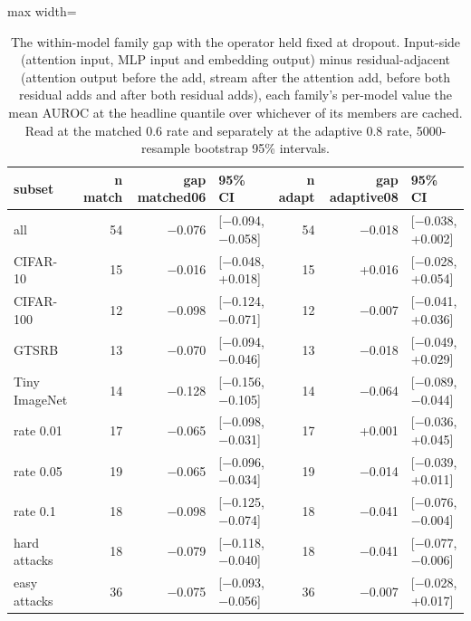 \begin{table}[htbp]
\centering
\small
\caption{The within-model family gap with the operator held fixed at dropout. Input-side (attention input, MLP input and embedding output) minus residual-adjacent (attention output before the add, stream after the attention add, before both residual adds and after both residual adds), each family's per-model value the mean AUROC at the headline quantile over whichever of its members are cached. Read at the matched 0.6 rate and separately at the adaptive 0.8 rate, 5000-resample bootstrap 95\% intervals.}
\label{tab:family-split-dropout}
\begin{adjustbox}{max width=\linewidth}
\begin{tabular}{lrrlrrl}
\toprule
subset & n match & gap matched06 & 95\% CI & n adapt & gap adaptive08 & 95\% CI \\
\midrule
all & 54 & $-$0.076 & [$-$0.094, $-$0.058] & 54 & $-$0.018 & [$-$0.038, +0.002] \\
CIFAR-10 & 15 & $-$0.016 & [$-$0.048, +0.018] & 15 & +0.016 & [$-$0.028, +0.054] \\
CIFAR-100 & 12 & $-$0.098 & [$-$0.124, $-$0.071] & 12 & $-$0.007 & [$-$0.041, +0.036] \\
GTSRB & 13 & $-$0.070 & [$-$0.094, $-$0.046] & 13 & $-$0.018 & [$-$0.049, +0.029] \\
Tiny ImageNet & 14 & $-$0.128 & [$-$0.156, $-$0.105] & 14 & $-$0.064 & [$-$0.089, $-$0.044] \\
rate 0.01 & 17 & $-$0.065 & [$-$0.098, $-$0.031] & 17 & +0.001 & [$-$0.036, +0.045] \\
rate 0.05 & 19 & $-$0.065 & [$-$0.096, $-$0.034] & 19 & $-$0.014 & [$-$0.039, +0.011] \\
rate 0.1 & 18 & $-$0.098 & [$-$0.125, $-$0.074] & 18 & $-$0.041 & [$-$0.076, $-$0.004] \\
hard attacks & 18 & $-$0.079 & [$-$0.118, $-$0.040] & 18 & $-$0.041 & [$-$0.077, $-$0.006] \\
easy attacks & 36 & $-$0.075 & [$-$0.093, $-$0.056] & 36 & $-$0.007 & [$-$0.028, +0.017] \\
\bottomrule
\end{tabular}
\end{adjustbox}
\end{table}
